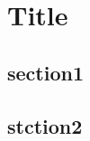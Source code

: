 \documentclass[11pt]{article}
\author{hap}
\date{\today}
\title{}
\begin{document}
\tableofcontents

\section{Title}
\label{sec:org8ba2972}
\subsection{section1}
\label{sec:orge225bbd}
\subsection{stction2}
\label{sec:orgc244230}
\end{document}
